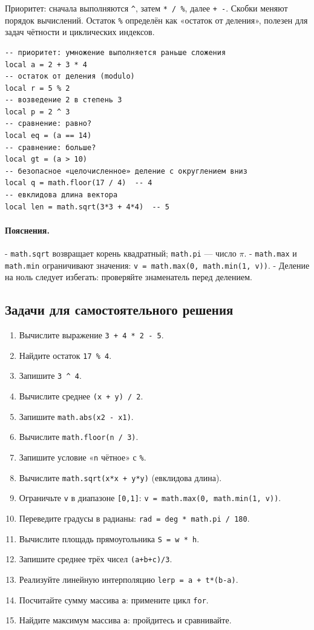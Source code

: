 Приоритет: сначала выполняются \verb|^|, затем \verb|* / %|, далее \verb|+ -|. Скобки меняют порядок вычислений. Остаток \verb|%| определён как «остаток от деления», полезен для задач чётности и циклических индексов.
\begin{verbatim}
-- приоритет: умножение выполняется раньше сложения
local a = 2 + 3 * 4
-- остаток от деления (modulo)
local r = 5 % 2
-- возведение 2 в степень 3
local p = 2 ^ 3
-- сравнение: равно?
local eq = (a == 14)
-- сравнение: больше?
local gt = (a > 10)
-- безопасное «целочисленное» деление с округлением вниз
local q = math.floor(17 / 4)  -- 4
-- евклидова длина вектора
local len = math.sqrt(3*3 + 4*4)  -- 5
\end{verbatim}
\paragraph{Пояснения.}
- \verb|math.sqrt| возвращает корень квадратный; \verb|math.pi| — число $\pi$.
- \verb|math.max| и \verb|math.min| ограничивают значения: \verb|v = math.max(0, math.min(1, v))|.
- Деление на ноль следует избегать: проверяйте знаменатель перед делением.
\subsection*{Задачи для самостоятельного решения}
\begin{enumerate}
  \item Вычислите выражение \verb|3 + 4 * 2 - 5|.
  \item Найдите остаток \verb|17 % 4|.
  \item Запишите \verb|3 ^ 4|.
  \item Вычислите среднее \verb|(x + y) / 2|.
  \item Запишите \verb|math.abs(x2 - x1)|.
  \item Вычислите \verb|math.floor(n / 3)|.
  \item Запишите условие «\verb|n| чётное» с \verb|%|.
  \item Вычислите \verb|math.sqrt(x*x + y*y)| (евклидова длина).
  \item Ограничьте \verb|v| в диапазоне \verb|[0,1]|: \verb|v = math.max(0, math.min(1, v))|.
  \item Переведите градусы в радианы: \verb|rad = deg * math.pi / 180|.
  \item Вычислите площадь прямоугольника \verb|S = w * h|.
  \item Запишите среднее трёх чисел \verb|(a+b+c)/3|.
  \item Реализуйте линейную интерполяцию \verb|lerp = a + t*(b-a)|.
  \item Посчитайте сумму массива \verb|a|: примените цикл \verb|for|.
  \item Найдите максимум массива \verb|a|: пройдитесь и сравнивайте.
\end{enumerate}


